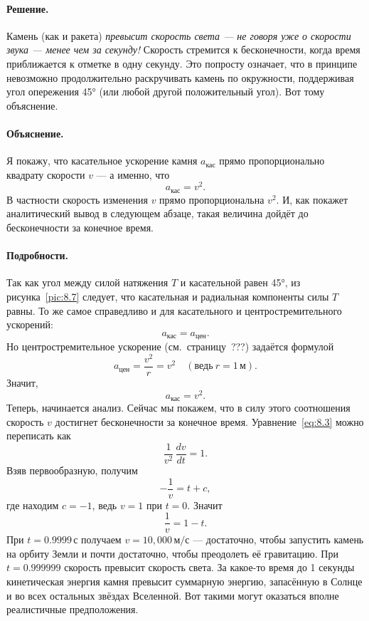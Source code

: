 \paragraph{Решение.}
Камень (как и ракета) \emph{превысит скорость света --- не говоря уже о скорости звука --- менее чем за секунду!}
Скорость стремится к бесконечности, когда время приближается к отметке в одну секунду.
Это попросту означает, что в принципе невозможно продолжительно раскручивать камень по окружности, поддерживая угол опережения 45° (или любой другой положительный угол).
Вот тому объяснение.

\paragraph{Объяснение.}
Я покажу, что касательное ускорение камня $a_{\text{кас}}$ прямо пропорционально квадрату скорости $v$ ---
а именно, что
\[
a_{\text{кас}} = v^{2}.
\]
В частности скорость изменения $v$ прямо пропорциональна $v^2$.
И, как покажет аналитический вывод в следующем абзаце, такая величина дойдёт до бесконечности за конечное время.

\paragraph{Подробности.}
Так как угол между силой натяжения $T$ и касательной равен 45°,
из рисунка~\ref{pic:8.7} следует, что касательная и радиальная компоненты силы $T$ равны.
То же самое справедливо и для касательного и центростремительного ускорений:
\[
a_{\text{кас}} = a_{\text{цен}}.
\]
Но центростремительное ускорение (см.~страницу~???) задаётся формулой
\[
a_{\text{цен}} = \frac{v^2}{r} = v^2 \quad (\text{ведь}\  r = 1\,\text{м}).
\]
Значит,
\begin{equation}
a_{\text{кас}} = v^2. \label{eq:8.3}
\end{equation}
Теперь, начинается анализ.
Сейчас мы покажем, что в силу этого соотношения
скорость $v$ достигнет бесконечности за конечное время.
Уравнение~\eqref{eq:8.3} можно переписать как
\begin{equation}
\frac{1}{v^2}\,\frac{dv}{dt} = 1. \label{eq:8.4}
\end{equation}
Взяв первообразную, получим
\[
-\frac{1}{v} = t + c,
\]
где находим $c = -1$, ведь $v = 1$ при $t = 0$.
Значит
\[
\frac{1}{v} = 1 - t.
\]
При $t = 0.9999 \,\text{с}$ получаем $v = 10{,}000 \,\text{м/с}$ ---
достаточно, чтобы запустить камень на орбиту Земли и почти достаточно,
чтобы преодолеть её гравитацию.
При $t = 0.999999$ скорость превысит скорость света.
За какое-то время до 1 секунды кинетическая энергия камня
превысит суммарную энергию, запасённую в Солнце и во всех остальных
звёздах Вселенной.
Вот такими могут оказаться вполне реалистичные предположения.

